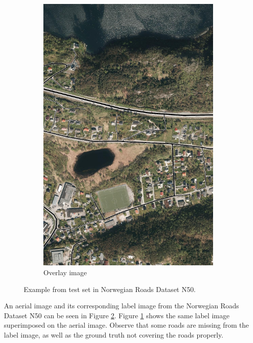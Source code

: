 \begin{figure}
\begin{subfigure}{0.32\textwidth}
\includegraphics[width=\linewidth]{figs/datasets/Norwegian_roads_overlay_example2.png}
\caption{Overlay image} \label{fig:norwegian_roads_example_overlay}
\end{subfigure}
\hspace*{\fill} %
\caption[Example from Norwegian Roads Dataset N50]{Example from test set in Norwegian Roads Dataset N50.} \label{fig:norwegian_roads_example}
\end{figure}

An aerial image and its corresponding label image from the Norwegian Roads Dataset N50 can be seen in Figure \ref{fig:norwegian_roads_example}. Figure \ref{fig:norwegian_roads_example_overlay} shows the same label image superimposed on the aerial image. Observe that some roads are missing from the label image, as well as the ground truth not covering the roads properly. \\
